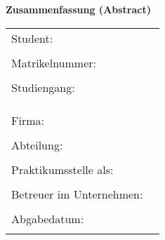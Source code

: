 
\begin{center}
{\Large \textbf{Zusammenfassung (Abstract)}}
\end{center}

\bigskip

\begin{center}
	\begin{tabular}{p{5cm}p{8.5cm}}
		Student: & \autor \\
		 & \\
		Matrikelnummer: & \matrikelnummer \\
		 & \\
		Studiengang: & \studiengang \\
		 & \\
		 & \\
		 & \\
		Firma: & \firma \\
		 & \\
		Abteilung: & \abteilung  \\[.5ex]
		 & \\
		Praktikumsstelle als: & \praktikumsstelle  \\[.5ex]
		 & \\
		Betreuer im Unternehmen: & \betreuer  \\[.5ex]
		 & \\
		Abgabedatum: & \abgabedatum \\
		 & \\
	\end{tabular}
\end{center}

\bigskip

\noindent
\zusammenfassung